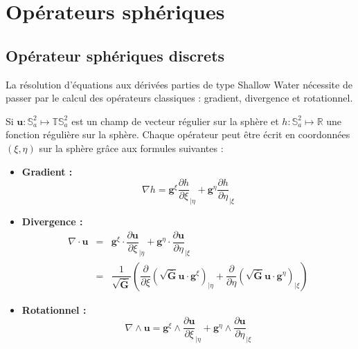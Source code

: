 
\chapter{Opérateurs sphériques}

\section{Opérateur sphériques discrets}

La résolution d'équations aux dérivées parties de type Shallow Water nécessite de passer par le calcul des opérateurs classiques : gradient, divergence et rotationnel.

Si $\mathbf{u} : \mathbb{S}_a^2 \mapsto \mathbb{T}\mathbb{S}_a^2$ est un champ de vecteur régulier sur la sphère et $h : \mathbb{S}_a^2 \mapsto\mathbb{R}$ une fonction régulière sur la sphère.
Chaque opérateur peut être écrit en coordonnées $(\xi, \eta)$ sur la sphère grâce aux formules suivantes :

\begin{itemize}
\item \textbf{Gradient :}
\begin{equation}
\nabla h = \mathbf{g}^{\xi} \dfrac{\partial h}{\partial \xi}_{|\eta} + \mathbf{g}^{\eta} \dfrac{\partial h}{\partial \eta}_{|\xi} 
\label{eq: gradient}
\end{equation}
\item \textbf{Divergence :}
\begin{equation}
\begin{array}{rcl}
\nabla \cdot \mathbf{u} & = & \mathbf{g}^{\xi} \cdot \dfrac{\partial \mathbf{u}}{\partial \xi}_{|\eta} + \mathbf{g}^{\eta} \cdot \dfrac{\partial \mathbf{u}}{\partial \eta}_{|\xi} \\
	& = & \dfrac{1}{\sqrt{\bar{\mathbf{G}}}} \left( \dfrac{\partial}{\partial \xi} \left( \sqrt{\bar{\mathbf{G}}} \mathbf{u} \cdot \mathbf{g}^{\xi} \right)_{|\eta} + \dfrac{\partial}{\partial \eta} \left( \sqrt{\bar{\mathbf{G}}} \mathbf{u} \cdot \mathbf{g}^{\eta} \right)_{|\xi} \right) 
\end{array}
\label{eq: divergence}
\end{equation}
\item \textbf{Rotationnel :}
\begin{equation}
\nabla \wedge \mathbf{u} = \mathbf{g}^{\xi} \wedge \dfrac{\partial \mathbf{u}}{\partial \xi}_{|\eta} + \mathbf{g}^{\eta} \wedge \dfrac{\partial \mathbf{u}}{\partial \eta}_{|\xi}  
\label{eq: rotationnel}
\end{equation}
\end{itemize}


